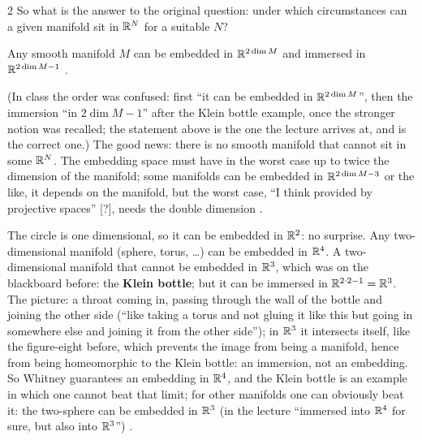 \begin{paracol}{2}
So what is the answer to the original question: under which circumstances can a given manifold sit in $\mathbb{R}^N$ for a suitable $N$?  
\begin{theorem}\label{thm:tb-whitney}
Any smooth manifold $M$ can be embedded in $\mathbb{R}^{2\dim M}$ and immersed in $\mathbb{R}^{2\dim M-1}$      .
\end{theorem}
(In class the order was confused: first ``it can be embedded in $\mathbb{R}^{2\dim M}$'', then the immersion ``in $2\dim M-1$'' after the Klein bottle example, once the stronger notion was recalled; the statement above is the one the lecture arrives at, and is the correct one.) The good news: there is no smooth manifold that cannot sit in some $\mathbb{R}^N$. The embedding space must
have in the worst case up to twice the dimension of the manifold; some manifolds can be embedded in $\mathbb{R}^{2\dim M-3}$ or the like, it depends on the manifold, but the worst case, ``I think provided by projective spaces'' [?], needs the double dimension  .
\begin{example}\label{ex:tb-klein}
The circle is one dimensional, so it can be embedded in $\mathbb{R}^2$: no surprise. Any two-dimensional manifold (sphere, torus, \dots) can be embedded in $\mathbb{R}^4$. A two-dimensional manifold that cannot be embedded in $\mathbb{R}^3$, which was on the blackboard before: the \textbf{Klein bottle}; but it can be immersed in $\mathbb{R}^{2\cdot2-1}=\mathbb{R}^3$. The picture: a throat
coming in, passing through the wall of the bottle and joining the other side (``like taking a torus and not gluing it like this but going in somewhere else and joining it from the other side''); in $\mathbb{R}^3$ it intersects itself, like the figure-eight before, which prevents the image from being a manifold, hence from being homeomorphic to the Klein bottle: an immersion, not an embedding.
So Whitney guarantees an embedding in $\mathbb{R}^4$, and the Klein bottle is an example in which one cannot beat that limit; for other manifolds one can obviously beat it: the two-sphere can be embedded in $\mathbb{R}^3$ (in the lecture ``immersed into $\mathbb{R}^4$ for sure, but also into $\mathbb{R}^3$'')
     .
\end{example}
\begin{coursenote}

\end{coursenote}
\end{paracol}
